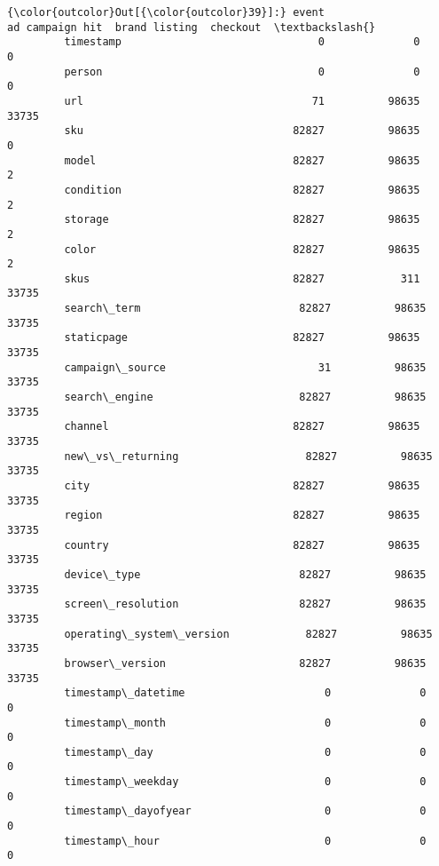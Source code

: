 \documentclass[11pt]{article}
\begin{document}
\begin{Verbatim}[commandchars=\\\{\}]
{\color{outcolor}Out[{\color{outcolor}39}]:} event                     ad campaign hit  brand listing  checkout  \textbackslash{}
         timestamp                               0              0         0   
         person                                  0              0         0   
         url                                    71          98635     33735   
         sku                                 82827          98635         0   
         model                               82827          98635         2   
         condition                           82827          98635         2   
         storage                             82827          98635         2   
         color                               82827          98635         2   
         skus                                82827            311     33735   
         search\_term                         82827          98635     33735   
         staticpage                          82827          98635     33735   
         campaign\_source                        31          98635     33735   
         search\_engine                       82827          98635     33735   
         channel                             82827          98635     33735   
         new\_vs\_returning                    82827          98635     33735   
         city                                82827          98635     33735   
         region                              82827          98635     33735   
         country                             82827          98635     33735   
         device\_type                         82827          98635     33735   
         screen\_resolution                   82827          98635     33735   
         operating\_system\_version            82827          98635     33735   
         browser\_version                     82827          98635     33735   
         timestamp\_datetime                      0              0         0   
         timestamp\_month                         0              0         0   
         timestamp\_day                           0              0         0   
         timestamp\_weekday                       0              0         0   
         timestamp\_dayofyear                     0              0         0   
         timestamp\_hour                          0              0         0   
         

\end{Verbatim}
\end{document}
